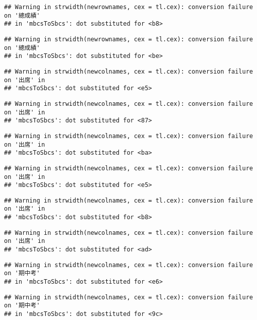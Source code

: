 \documentclass[
]{book}
\begin{document}
\begin{verbatim}
## Warning in strwidth(newrownames, cex = tl.cex): conversion failure on '總成績'
## in 'mbcsToSbcs': dot substituted for <b8>
\end{verbatim}

\begin{verbatim}
## Warning in strwidth(newrownames, cex = tl.cex): conversion failure on '總成績'
## in 'mbcsToSbcs': dot substituted for <be>
\end{verbatim}

\begin{verbatim}
## Warning in strwidth(newcolnames, cex = tl.cex): conversion failure on '出席' in
## 'mbcsToSbcs': dot substituted for <e5>
\end{verbatim}

\begin{verbatim}
## Warning in strwidth(newcolnames, cex = tl.cex): conversion failure on '出席' in
## 'mbcsToSbcs': dot substituted for <87>
\end{verbatim}

\begin{verbatim}
## Warning in strwidth(newcolnames, cex = tl.cex): conversion failure on '出席' in
## 'mbcsToSbcs': dot substituted for <ba>
\end{verbatim}

\begin{verbatim}
## Warning in strwidth(newcolnames, cex = tl.cex): conversion failure on '出席' in
## 'mbcsToSbcs': dot substituted for <e5>
\end{verbatim}

\begin{verbatim}
## Warning in strwidth(newcolnames, cex = tl.cex): conversion failure on '出席' in
## 'mbcsToSbcs': dot substituted for <b8>
\end{verbatim}

\begin{verbatim}
## Warning in strwidth(newcolnames, cex = tl.cex): conversion failure on '出席' in
## 'mbcsToSbcs': dot substituted for <ad>
\end{verbatim}

\begin{verbatim}
## Warning in strwidth(newcolnames, cex = tl.cex): conversion failure on '期中考'
## in 'mbcsToSbcs': dot substituted for <e6>
\end{verbatim}

\begin{verbatim}
## Warning in strwidth(newcolnames, cex = tl.cex): conversion failure on '期中考'
## in 'mbcsToSbcs': dot substituted for <9c>
\end{verbatim}
\end{document}
